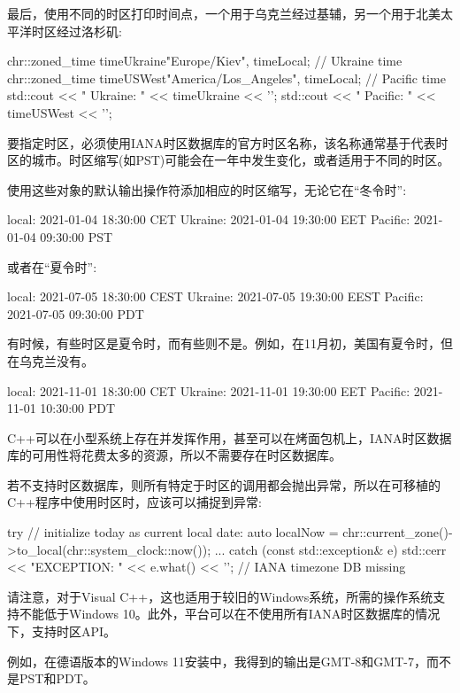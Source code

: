 
最后，使用不同的时区打印时间点，一个用于乌克兰经过基辅，另一个用于北美太平洋时区经过洛杉矶:

\begin{cpp}
chr::zoned_time timeUkraine{"Europe/Kiev", timeLocal}; // Ukraine time
chr::zoned_time timeUSWest{"America/Los_Angeles", timeLocal}; // Pacific time
std::cout << " Ukraine: " << timeUkraine << '\n';
std::cout << " Pacific: " << timeUSWest << '\n';
\end{cpp}

要指定时区，必须使用IANA时区数据库的官方时区名称，该名称通常基于代表时区的城市。时区缩写(如PST)可能会在一年中发生变化，或者适用于不同的时区。

使用这些对象的默认输出操作符添加相应的时区缩写，无论它在“冬令时”:

\begin{shell}
local:   2021-01-04 18:30:00 CET
Ukraine: 2021-01-04 19:30:00 EET
Pacific: 2021-01-04 09:30:00 PST
\end{shell}

或者在“夏令时”:

\begin{shell}
local:   2021-07-05 18:30:00 CEST
Ukraine: 2021-07-05 19:30:00 EEST
Pacific: 2021-07-05 09:30:00 PDT
\end{shell}

有时候，有些时区是夏令时，而有些则不是。例如，在11月初，美国有夏令时，但在乌克兰没有。

\begin{shell}
local:   2021-11-01 18:30:00 CET
Ukraine: 2021-11-01 19:30:00 EET
Pacific: 2021-11-01 10:30:00 PDT
\end{shell}


C++可以在小型系统上存在并发挥作用，甚至可以在烤面包机上，IANA时区数据库的可用性将花费太多的资源，所以不需要存在时区数据库。

若不支持时区数据库，则所有特定于时区的调用都会抛出异常，所以在可移植的C++程序中使用时区时，应该可以捕捉到异常:

\begin{cpp}
try {
	// initialize today as current local date:
	auto localNow = chr::current_zone()->to_local(chr::system_clock::now());
	...
}
catch (const std::exception& e) {
	std::cerr << "EXCEPTION: " << e.what() << '\n'; // IANA timezone DB missing
}
\end{cpp}

请注意，对于Visual C++，这也适用于较旧的Windows系统，所需的操作系统支持不能低于Windows 10。此外，平台可以在不使用所有IANA时区数据库的情况下，支持时区API。

例如，在德语版本的Windows 11安装中，我得到的输出是GMT-8和GMT-7，而不是PST和PDT。















